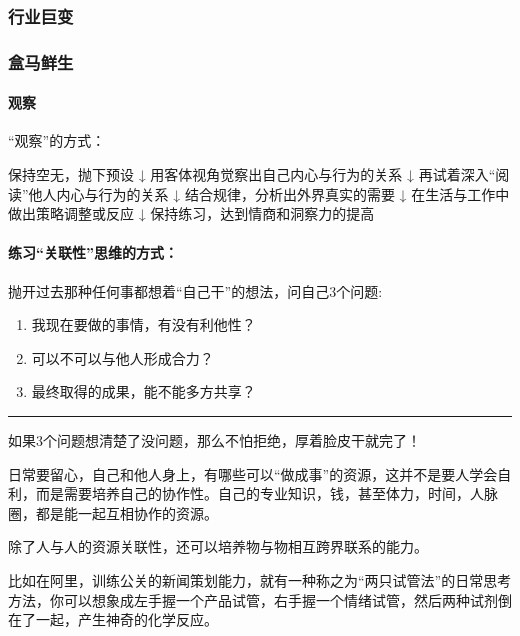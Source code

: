 \documentclass[letterpaper,11pt,english]{sphinxmanual}
\begin{document}
\subsubsection{行业巨变}
\label{\detokenize{chapter_experience/issue:id1}}\label{\detokenize{chapter_experience/issue::doc}}

\subsubsection{盒马鲜生}
\label{\detokenize{chapter_experience/hema:id1}}\label{\detokenize{chapter_experience/hema::doc}}

\paragraph{观察}
\label{\detokenize{chapter_experience/hema:id2}}
“观察”的方式：

保持空无，抛下预设 ↓ 用客体视角觉察出自己内心与行为的关系 ↓
再试着深入“阅读”他人内心与行为的关系 ↓ 结合规律，分析出外界真实的需要 ↓
在生活与工作中做出策略调整或反应 ↓ 保持练习，达到情商和洞察力的提高


\paragraph{练习“关联性”思维的方式：}
\label{\detokenize{chapter_experience/hema:id3}}
抛开过去那种任何事都想着“自己干”的想法，问自己3个问题:
\begin{enumerate}
%
\item {} 
我现在要做的事情，有没有利他性？

\item {} 
可以不可以与他人形成合力？

\item {} 
最终取得的成果，能不能多方共享？

\end{enumerate}


\bigskip\hrule\bigskip


如果3个问题想清楚了没问题，那么不怕拒绝，厚着脸皮干就完了！

日常要留心，自己和他人身上，有哪些可以“做成事”的资源，这并不是要人学会自利，而是需要培养自己的协作性。自己的专业知识，钱，甚至体力，时间，人脉圈，都是能一起互相协作的资源。

除了人与人的资源关联性，还可以培养物与物相互跨界联系的能力。

比如在阿里，训练公关的新闻策划能力，就有一种称之为“两只试管法”的日常思考方法，你可以想象成左手握一个产品试管，右手握一个情绪试管，然后两种试剂倒在了一起，产生神奇的化学反应。
\end{document}
